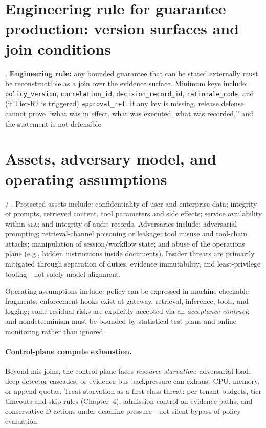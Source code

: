 \documentclass[11pt,a4paper]{report}
\begin{document}
\section{Engineering rule for guarantee production: version surfaces and join conditions}
\ControlPlane{}. \textbf{Engineering rule:} any bounded guarantee that can be stated externally must be reconstructible as a join over the evidence surface. Minimum keys include: \texttt{policy\_version}, \texttt{correlation\_id}, \texttt{decision\_record\_id}, \texttt{rationale\_code}, and (if Tier-R2 is triggered) \texttt{approval\_ref}. If any key is missing, release defense cannot prove “what was in effect, what was executed, what was recorded,” and the statement is not defensible.

\section{Assets, adversary model, and operating assumptions}
\ControlPlane{} / \EvalFramework{}. Protected assets include: confidentiality of user and enterprise data; integrity of prompts, retrieved content, tool parameters and side effects; service availability within \textsc{sla}; and integrity of audit records. Adversaries include: adversarial prompting; retrieval-channel poisoning or leakage; tool misuse and tool-chain attacks; manipulation of session/workflow state; and abuse of the operations plane (e.g., hidden instructions inside documents). Insider threats are primarily mitigated through separation of duties, evidence immutability, and least-privilege tooling—not solely model alignment.

Operating assumptions include: policy can be expressed in machine-checkable fragments; enforcement hooks exist at gateway, retrieval, inference, tools, and logging; some residual risks are explicitly accepted via an \emph{acceptance contract}; and nondeterminism must be bounded by statistical test plans and online monitoring rather than ignored.

\paragraph{Control-plane compute exhaustion.} Beyond mis-joins, the control plane faces \emph{resource starvation}: adversarial load, deep detector cascades, or evidence-bus backpressure can exhaust CPU, memory, or append quotas. Treat starvation as a first-class threat: per-tenant budgets, tier timeouts and skip rules (Chapter~4), admission control on evidence paths, and conservative D-actions under deadline pressure---not silent bypass of policy evaluation.
\end{document}

